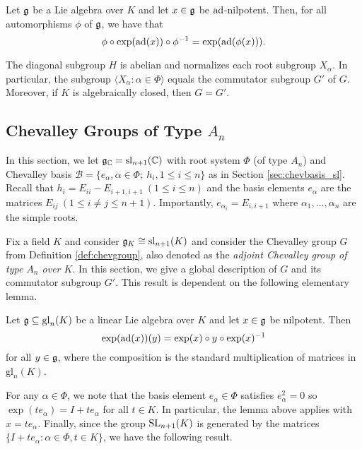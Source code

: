 \begin{lemma}\label{lem:conjxalpla}
    Let $\mathfrak{g}$ be a Lie algebra over $K$ and let $x\in\mathfrak{g}$ be $\mathrm{ad}$-nilpotent. Then, for all automorphisms $\phi$ of $\mathfrak{g}$, we have that 
    $$\phi\circ\exp(\mathrm{ad}(x))\circ\phi^{-1}=\exp(\mathrm{ad}(\phi(x))).$$
\end{lemma}

\begin{cor}
    The diagonal subgroup $H$ is abelian and normalizes each root subgroup $X_\alpha$. In particular, the subgroup $\langle X_\alpha:\alpha\in\Phi\rangle$ equals the commutator subgroup $G'$ of $G$. Moreover, if $K$ is algebraically closed, then $G=G'$.
\end{cor}

\subsection{Chevalley Groups of Type \texorpdfstring{$A_n$}{PDFstring}}

In this section, we let $\mathfrak{g}_{\mathbb{C}}=\mathrm{sl}_{n+1}(\mathbb{C})$ with root system $\Phi$ (of type $A_n$) and Chevalley basis $\mathcal{B}=\{e_\alpha,\alpha\in\Phi;\ h_i,1\leq i\leq n\}$ as in Section \ref{sec:chevbasis_sl}. Recall that $h_i=E_{ii}-E_{i+1,i+1}\ (1\leq i\leq n)$ and the basis elements $e_\alpha$ are the matrices $E_{ij}\ (1\leq i\neq j\leq n+1)$. Importantly, $e_{\alpha_i}=E_{i,i+1}$ where $\alpha_1,\ldots,\alpha_n$ are the simple roots. 

Fix a field $K$ and consider $\mathfrak{g}_K\cong\mathrm{sl}_{n+1}(K)$ and consider the Chevalley group $G$ from Definition \ref{def:chevgroup}, also denoted as the \textit{adjoint Chevalley group of type $A_n$ over $K$}. In this section, we give a global description of $G$ and its commutator subgroup $G'$. This result is dependent on the following elementary lemma.

\begin{lemma}\label{lem:identityexp}
    Let $\mathfrak{g}\subseteq\mathrm{gl}_n(K)$ be a linear Lie algebra over $K$ and let $x\in\mathfrak{g}$ be nilpotent. Then 
    $$\exp(\mathrm{ad}(x))(y)=\exp(x)\circ y\circ \exp(x)^{-1}$$
    for all $y\in\mathfrak{g}$, where the composition is the standard multiplication of matrices in $\mathrm{gl}_n(K)$.
\end{lemma}

For any $\alpha\in\Phi$, we note that the basis element $e_\alpha\in\Phi$ satisfies $e_\alpha^2=0$ so $\exp(t e_\alpha)=I+t e_\alpha$ for all $t\in K$. In particular, the lemma above applies with $x=t e_\alpha$. Finally, since the group $\mathrm{SL}_{n+1}(K)$ is generated by the matrices $\{I+t e_\alpha:\alpha\in\Phi, t\in K\}$, we have the following result.


